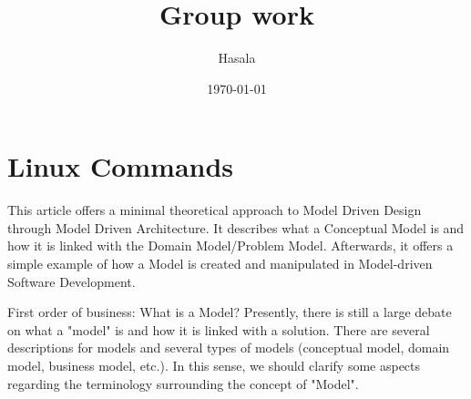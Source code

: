 \documentclass{article}
\title{Group work}
\date{\today}
\author{Hasala}
\begin{document}
\maketitle

\section{Linux Commands}

This article offers a minimal theoretical approach to Model Driven Design through Model Driven Architecture. It describes what a Conceptual Model is and how it is linked with the Domain Model/Problem Model. Afterwards, it offers a simple example of how a Model is created and manipulated in Model-driven Software Development.

First order of business: What is a Model? Presently, there is still a large debate on what a "model" is and how it is linked with a solution. There are several descriptions for models and several types of models (conceptual model, domain model, business model, etc.). In this sense, we should clarify some aspects regarding the terminology surrounding the concept of "Model".
\end{document}
